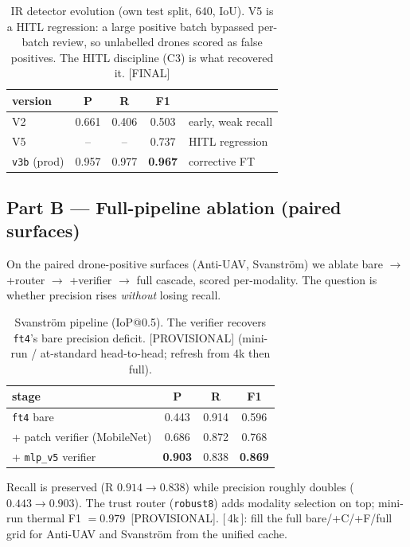 \documentclass[11pt]{article}
\newcommand{\final}{{\small\textcolor{green!45!black}{[FINAL]}}}
\newcommand{\prov}{{\small\textcolor{orange!80!black}{[PROVISIONAL]}}}
\newcommand{\todo}[1]{{\small\textcolor{red!70!black}{[\,#1\,]}}}
\begin{document}
\begin{table}[h]\centering
\caption{IR detector evolution (own test split, 640, IoU). V5 is a HITL regression: a large
positive batch bypassed per-batch review, so unlabelled drones scored as false positives. The
HITL discipline (C3) is what recovered it. \final{}}
\begin{tabular}{lcccl}
\toprule
version & P & R & F1 & \\
\midrule
V2  & 0.661 & 0.406 & 0.503 & early, weak recall \\ %
V5  & --    & --    & 0.737 & HITL regression \\       %
\texttt{v3b} (prod) & 0.957 & 0.977 & \textbf{0.967} & corrective FT \\ %
\bottomrule
\end{tabular}
\end{table}

\subsection{Part B --- Full-pipeline ablation (paired surfaces)}
\label{sec:partB}
On the paired drone-positive surfaces (Anti-UAV, Svanstr\"om) we ablate
bare $\rightarrow$ +router $\rightarrow$ +verifier $\rightarrow$ full cascade, scored per-modality.
The question is whether precision rises \emph{without} losing recall.

\begin{table}[h]\centering
\caption{Svanstr\"om pipeline (IoP@0.5). The verifier recovers \texttt{ft4}'s bare precision deficit.
\prov{} (mini-run / at-standard head-to-head; refresh from 4k then full).}
\begin{tabular}{lccc}
\toprule
stage & P & R & F1 \\
\midrule
\texttt{ft4} bare        & 0.443 & 0.914 & 0.596 \\ %
+ patch verifier (MobileNet) & 0.686 & 0.872 & 0.768 \\ %
+ \texttt{mlp\_v5} verifier   & \textbf{0.903} & 0.838 & \textbf{0.869} \\ %
\bottomrule
\end{tabular}
\end{table}

\noindent Recall is preserved (R $0.914\!\rightarrow\!0.838$) while precision roughly doubles
($0.443\!\rightarrow\!0.903$). The trust router (\texttt{robust8}) adds modality selection on top;
mini-run thermal F1 $=0.979$~\prov{}. %
\todo{4k}: fill the full bare/+C/+F/full grid for Anti-UAV and Svanstr\"om from the unified cache.
\end{document}
